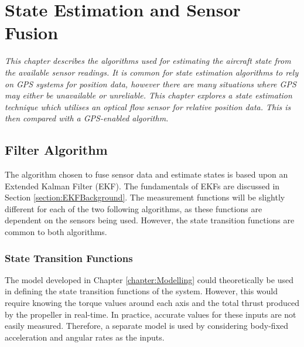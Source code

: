
\chapter{State Estimation and Sensor Fusion}
\textit{This chapter describes the algorithms used for estimating the aircraft state from the available sensor readings. It is common for state estimation algorithms to rely on GPS systems for position data, however there are many situations where GPS may either be unavailable or unreliable. This chapter explores a state estimation technique which utilises an optical flow sensor for relative position data. This is then compared with a GPS-enabled algorithm.}

\section{Filter Algorithm}\label{section:Filter}
The algorithm chosen to fuse sensor data and estimate states is based upon an Extended Kalman Filter (EKF). The fundamentals of EKFs are discussed in Section \ref{section:EKFBackground}. The measurement functions will be slightly different for each of the two following algorithms, as these functions are dependent on the sensors being used. However, the state transition functions are common to both algorithms. 

\subsection{State Transition Functions}\label{section:StateTrans}
The model developed in Chapter \ref{chapter:Modelling} could theoretically be used in defining the state transition functions of the system. However, this would require knowing the torque values around each axis and the total thrust produced by the propeller in real-time. In practice, accurate values for these inputs are not easily measured. Therefore, a separate model is used by considering body-fixed acceleration and angular rates as the inputs.

